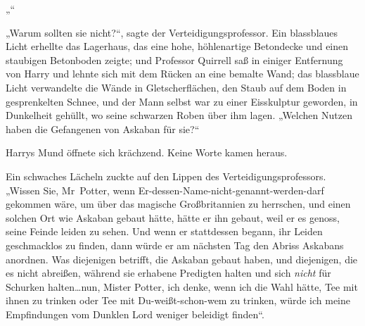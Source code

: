 „“

„Warum sollten sie nicht?“, sagte der Verteidigungsprofessor. Ein blassblaues Licht erhellte das Lagerhaus, das eine hohe, höhlenartige Betondecke und einen staubigen Betonboden zeigte; und Professor Quirrell saß in einiger Entfernung von Harry und lehnte sich mit dem Rücken an eine bemalte Wand; das blassblaue Licht verwandelte die Wände in Gletscherflächen, den Staub auf dem Boden in gesprenkelten Schnee, und der Mann selbst war zu einer Eisskulptur geworden, in Dunkelheit gehüllt, wo seine schwarzen Roben über ihm lagen. „Welchen Nutzen haben die Gefangenen von Askaban für sie?“

Harrys Mund öffnete sich krächzend. Keine Worte kamen heraus.

Ein schwaches Lächeln zuckte auf den Lippen des Verteidigungsprofessors. „Wissen Sie, Mr~Potter, wenn Er-dessen-Name-nicht-genannt-werden-darf gekommen wäre, um über das magische Großbritannien zu herrschen, und einen solchen Ort wie Askaban gebaut hätte, hätte er ihn gebaut, weil er es genoss, seine Feinde leiden zu sehen. Und wenn er stattdessen begann, ihr Leiden geschmacklos zu finden, dann würde er am nächsten Tag den Abriss Askabans anordnen. Was diejenigen betrifft, die Askaban gebaut haben, und diejenigen, die es nicht abreißen, während sie erhabene Predigten halten und sich \emph{nicht} für Schurken halten…nun, Mister Potter, ich denke, wenn ich die Wahl hätte, Tee mit ihnen zu trinken oder Tee mit Du-weißt-schon-wem zu trinken, würde ich meine Empfindungen vom Dunklen Lord weniger beleidigt finden“.

